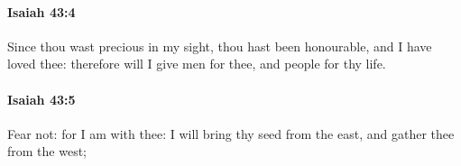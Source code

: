 		\paragraph{Isaiah 43:4} %
			\label{ISAIAH-43-4}

			Since thou wast precious in my sight, thou hast been honourable, and I have loved thee: therefore will I give men for thee, and people for thy life.


		\paragraph{Isaiah 43:5} %
			\label{ISAIAH-43-5}

			Fear not: for I am with thee: I will bring thy seed from the east, and gather thee from the west;


